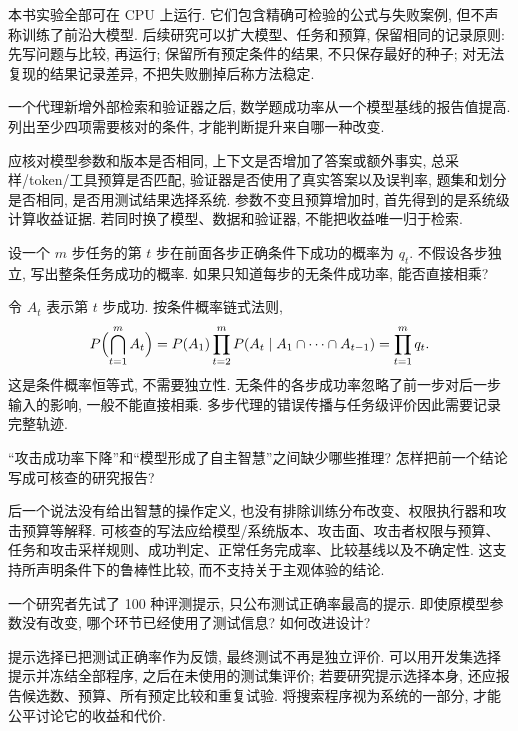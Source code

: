 本书实验全部可在 CPU 上运行. 它们包含精确可检验的公式与失败案例, 但不声称训练了前沿大模型. 后续研究可以扩大模型、任务和预算, 保留相同的记录原则: 先写问题与比较, 再运行; 保留所有预定条件的结果, 不只保存最好的种子; 对无法复现的结果记录差异, 不把失败删掉后称方法稳定.

\begin{exercise}
一个代理新增外部检索和验证器之后, 数学题成功率从一个模型基线的报告值提高. 列出至少四项需要核对的条件, 才能判断提升来自哪一种改变.
\end{exercise}
\begin{solution}
应核对模型参数和版本是否相同, 上下文是否增加了答案或额外事实, 总采样/token/工具预算是否匹配, 验证器是否使用了真实答案以及误判率, 题集和划分是否相同, 是否用测试结果选择系统. 参数不变且预算增加时, 首先得到的是系统级计算收益证据. 若同时换了模型、数据和验证器, 不能把收益唯一归于检索.
\end{solution}
\begin{exercise}
设一个 $m$ 步任务的第 $t$ 步在前面各步正确条件下成功的概率为 $q_t$. 不假设各步独立, 写出整条任务成功的概率. 如果只知道每步的无条件成功率, 能否直接相乘?
\end{exercise}
\begin{solution}
令 $A_t$ 表示第 $t$ 步成功. 按条件概率链式法则,
\[
 P\Bigl(\bigcap_{t=1}^{m}A_t\Bigr)
 =P(A_1)\prod_{t=2}^{m}P(A_t\mid A_1\cap\cdots\cap A_{t-1})
 =\prod_{t=1}^{m}q_t.
\]
这是条件概率恒等式, 不需要独立性. 无条件的各步成功率忽略了前一步对后一步输入的影响, 一般不能直接相乘. 多步代理的错误传播与任务级评价因此需要记录完整轨迹.
\end{solution}
\begin{exercise}
“攻击成功率下降”和“模型形成了自主智慧”之间缺少哪些推理? 怎样把前一个结论写成可核查的研究报告?
\end{exercise}
\begin{solution}
后一个说法没有给出智慧的操作定义, 也没有排除训练分布改变、权限执行器和攻击预算等解释. 可核查的写法应给模型/系统版本、攻击面、攻击者权限与预算、任务和攻击采样规则、成功判定、正常任务完成率、比较基线以及不确定性. 这支持所声明条件下的鲁棒性比较, 而不支持关于主观体验的结论.
\end{solution}
\begin{exercise}
一个研究者先试了 100 种评测提示, 只公布测试正确率最高的提示. 即使原模型参数没有改变, 哪个环节已经使用了测试信息? 如何改进设计?
\end{exercise}
\begin{solution}
提示选择已把测试正确率作为反馈, 最终测试不再是独立评价. 可以用开发集选择提示并冻结全部程序, 之后在未使用的测试集评价; 若要研究提示选择本身, 还应报告候选数、预算、所有预定比较和重复试验. 将搜索程序视为系统的一部分, 才能公平讨论它的收益和代价.
\end{solution}
\label{ch:end:01}
